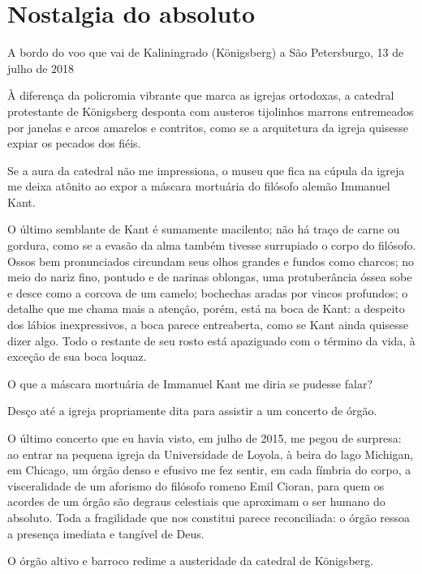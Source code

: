 \chapter*{Nostalgia do absoluto}

\begin{flushright}
A bordo do voo que vai de Kaliningrado (Königsberg) a São Petersburgo,
13 de julho de 2018
\end{flushright}

À diferença da policromia vibrante que marca as igrejas ortodoxas, a
catedral protestante de Königsberg desponta com austeros tijolinhos
marrons entremeados por janelas e arcos amarelos e contritos, como se a
arquitetura da igreja quisesse expiar os pecados dos fiéis.

Se a aura da catedral não me impressiona, o museu que fica na cúpula da
igreja me deixa atônito ao expor a máscara mortuária do filósofo alemão
Immanuel Kant.

O último semblante de Kant é sumamente macilento; não há traço de carne
ou gordura, como se a evasão da alma também tivesse surrupiado o corpo
do filósofo. Ossos bem pronunciados circundam seus olhos grandes e
fundos como charcos; no meio do nariz fino, pontudo e de narinas
oblongas, uma protuberância óssea sobe e desce como a corcova de um
camelo; bochechas aradas por vincos profundos; o detalhe que me chama
mais a atenção, porém, está na boca de Kant: a despeito dos lábios
inexpressivos, a boca parece entreaberta, como se Kant ainda quisesse
dizer algo. Todo o restante de seu rosto está apaziguado com o término
da vida, à exceção de sua boca loquaz.

O que a máscara mortuária de Immanuel Kant me diria se pudesse falar?

Desço até a igreja propriamente dita para assistir a um concerto de
órgão.

O último concerto que eu havia visto, em julho de 2015, me pegou de
surpresa: ao entrar na pequena igreja da Universidade de Loyola, à beira
do lago Michigan, em Chicago, um órgão denso e efusivo me fez sentir, em
cada fímbria do corpo, a visceralidade de um aforismo do filósofo romeno
Emil Cioran, para quem os acordes de um órgão são degraus celestiais que
aproximam o ser humano do absoluto. Toda a fragilidade que nos constitui
parece reconciliada: o órgão ressoa a presença imediata e tangível de
Deus.

O órgão altivo e barroco redime a austeridade da catedral de Königsberg.

